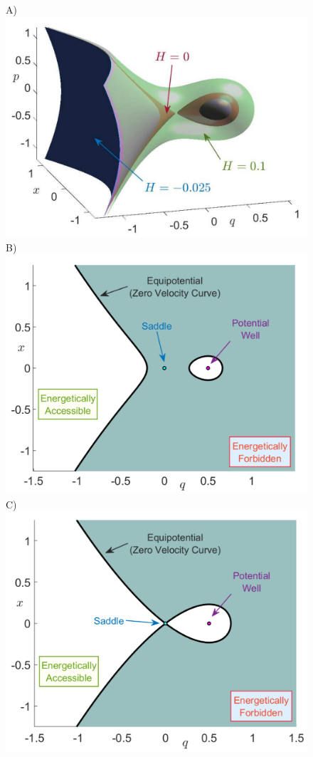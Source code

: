 \documentclass{ws-ijbc}
\begin{document}
\begin{figure}[!ht]
	\begin{center}		
		A)\includegraphics[scale=0.33]{fig7a}
		B)\includegraphics[scale=0.31]{fig7b}
		C)\includegraphics[scale=0.33]{fig7c}

\end{center}
\end{figure}
\end{document}
